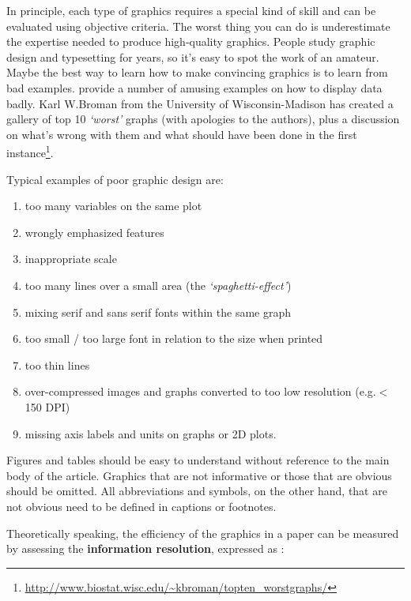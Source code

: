 \documentclass[graybox,envcountchap,sectrefs,UStrade]{svmono}
\begin{document}
In principle, each type of graphics requires a special kind of skill and can be evaluated using objective criteria. The worst thing you can do is underestimate the expertise needed to produce high-quality graphics. People study graphic design and typesetting for years, so it's easy to spot the work of an amateur. Maybe the best way to learn how to make convincing graphics is to learn from bad examples. \citet{Wainer1984TAS} provide a number of amusing examples on how to display data badly. Karl W.\@ Broman from the University of Wisconsin-Madison has created a gallery of top 10 \emph{`worst'} graphs (with apologies to the authors), plus a discussion on what's wrong with them and what should have been done in the first instance\footnote{\url{http://www.biostat.wisc.edu/~kbroman/topten\_worstgraphs/}}.  \par

Typical examples of poor graphic design are:

\begin{enumerate}
\renewcommand{\labelenumi}{(\textit{\alph{enumi}})}
  \item too many variables on the same plot
  \item wrongly emphasized features
  \item inappropriate scale
  \item too many lines over a small area (the \emph{`spaghetti-effect'})
  \item mixing serif and sans serif fonts within the same graph
  \item too small / too large font in relation to the size when printed
  \item too thin lines
  \item over-compressed images and graphs converted to too low resolution (e.g.\@ $<$150 DPI)
  \item missing axis labels and units on graphs or 2D plots.
\end{enumerate}

Figures and tables should be easy to understand without reference to the main body of the article. Graphics that are not informative or those that are obvious should be omitted. All abbreviations and symbols, on the other hand, that are not obvious need to be defined in captions or footnotes.\par

Theoretically speaking, the efficiency of the graphics in a paper can be measured by assessing the \textbf{information resolution}, expressed as \citep{Tufte1992}:
\end{document}
